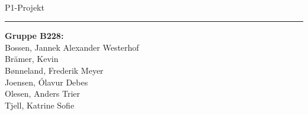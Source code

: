 \newcommand{\HRule}[1]{\hfill \rule{0.2\linewidth}{#1}} 

\thispagestyle{empty} 
\vspace*{1.5cm}

\noindent \colorbox{Sapphire}{
	 \parbox[t]{1.0\linewidth}{
		\centering \fontsize{50pt}{80pt}\selectfont
		\vspace*{1.0cm}
        \textcolor{White}{
		\vspace*{0.7cm}
        }
	}
}
\\[2em]
\huge P1-Projekt

\vfill
\flushright
\flushright \rule[20pt]{0.1pt}{9em}  \begin{minipage}[b]{0.50\linewidth}
{
\Large
\textbf{Gruppe B228:} \\
    Bossen, Jannek Alexander Westerhof\\
    Brämer, Kevin\\
    Bønneland, Frederik Meyer\\
    Joensen, Ólavur Debes\\
    Olesen, Anders Trier\\
    Tjell, Katrine Sofie\\
}
\end{minipage}
\clearpage 
